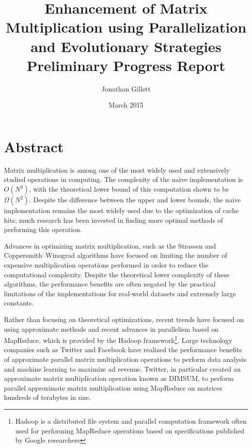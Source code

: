 \documentclass[oneside]{article}
\title{Enhancement of Matrix Multiplication using Parallelization and Evolutionary Strategies \\ \vspace{2 mm} {\Large Preliminary Progress Report}}
\author{Jonathan Gillett}
\date{March 2015}
\begin{document}
\maketitle



\section{Abstract}

\doublespacing
Matrix multiplication is among one of the most widely used and extensively studied operations in computing\cite{raz2002complexity}. The complexity of the naive implementation is $O(N^{3})$\cite{raz2002complexity}, with the theoretical lower bound of this computation shown to be $\Omega(N^{2})$\cite{raz2002complexity}. Despite the difference between the upper and lower bounds, the naive implementation remains the most widely used due to the optimization of cache hits\cite{note2002reducing}; much research has been invested in finding more optimal methods of performing this operation.

Advances in optimizing matrix multiplication, such as the Strassen and Coppersmith–Winograd algorithms\cite{huss1996implementation, coppersmith1987matrix} have focused on limiting the number of expensive multiplication operations performed in order to reduce the computational complexity. Despite the theoretical lower complexity of these algorithms, the performance benefits are often negated by the practical limitations of the implementations for real-world datasets and extremely large constants\cite{robinson2005toward}.

Rather than focusing on theoretical optimizations, recent trends have focused on using approximate methods and recent advances in parallelism based on MapReduce, which is provided by the Hadoop framework\footnote{Hadoop is a distributed file system and parallel computation framework\cite{shvachko2010hadoop} often used for performing MapReduce operations based on specifications published by Google researchers\cite{dean2008mapreduce}}. Large technology companies such as Twitter and Facebook have realized the performance benefits of approximate parallel matrix multiplication operations to perform data analysis and machine learning to maximize ad revenue. Twitter, in particular created an approximate matrix multiplication operation known as DIMSUM, to perform parallel approximate matrix multiplication using MapReduce on matrices hundreds of terabytes in size\cite{zadeh2013dimension}.
\end{document}
